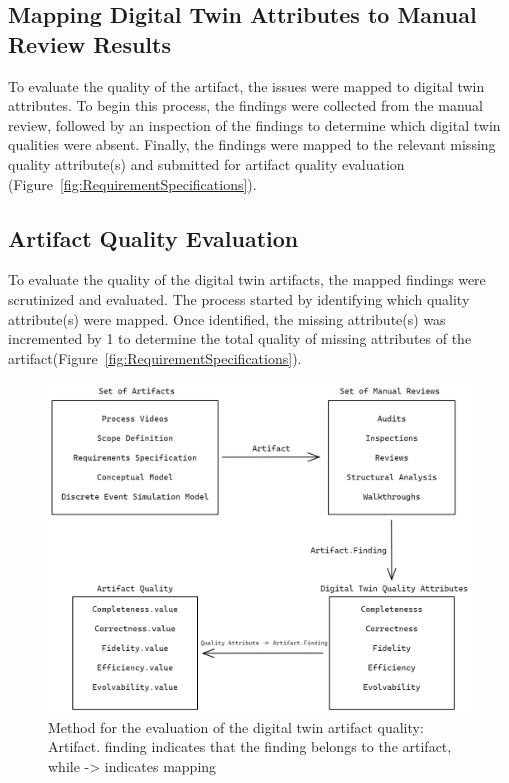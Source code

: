 \documentclass{llncs}
\begin{document}
    \subsection{Mapping Digital Twin Attributes to Manual Review Results}
    To evaluate the quality of the artifact, the issues were mapped to digital twin attributes. 
    To begin this process, the findings were collected from the manual review, followed by an inspection of the findings to determine which digital twin qualities were absent. 
    Finally, the findings were mapped to the relevant missing quality attribute(s) and submitted for artifact quality evaluation (Figure~\ref{fig:RequirementSpecifications}). 
    
    \subsection{Artifact Quality Evaluation}
    To evaluate the quality of the digital twin artifacts, the mapped findings were scrutinized and evaluated. 
    The process started by identifying which quality attribute(s) were mapped. 
    Once identified, the missing attribute(s) was incremented by 1 to determine the total quality of missing attributes of the artifact(Figure~\ref{fig:RequirementSpecifications}). 
    
    \begin{figure}[htbp]
        \includegraphics[scale = 0.30]{RequirementSpecifications.png}
        \caption{Method for the evaluation of the digital twin artifact quality: Artifact. finding indicates that the finding belongs to the artifact, while -> indicates mapping}
        \label{fig:Method}
    \end{figure}
    
\end{document}
